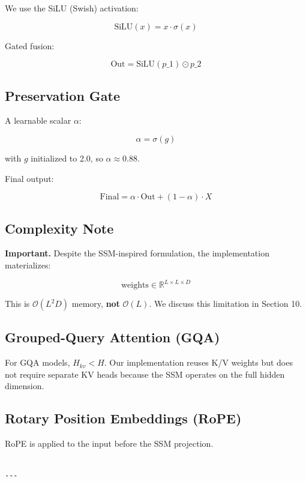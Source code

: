 We use the SiLU (Swish) activation:

\[
\text{SiLU}(x) = x \cdot \sigma(x)
\tag{3.13}
\]

Gated fusion:

\[
\text{Out} = \text{SiLU}(p\_1) \odot p\_2
\tag{3.14}
\]

\subsection{Preservation Gate}

A learnable scalar $\alpha$:

\[
\alpha = \sigma(g)
\tag{3.15}
\]

with $g$ initialized to 2.0, so $\alpha \approx 0.88$.

Final output:

\[
\text{Final} = \alpha \cdot \text{Out} + (1 - \alpha) \cdot X
\tag{3.16}
\]

\subsection{Complexity Note}

\textbf{Important.} Despite the SSM-inspired formulation, the implementation 
materializes:

\[
\text{weights} \in \mathbb{R}^{L \times L \times D}
\tag{3.17}
\]

This is $\mathcal{O}(L^2 D)$ memory, \textbf{not} $\mathcal{O}(L)$. We discuss 
this limitation in Section 10.

\subsection{Grouped-Query Attention (GQA)}

For GQA models, $H_{kv} < H$. Our implementation reuses K/V weights but 
does not require separate KV heads because the SSM operates on the full 
hidden dimension.

\subsection{Rotary Position Embeddings (RoPE)}

RoPE is applied to the input before the SSM projection.
\begin{lstlisting}

---
\end{lstlisting}